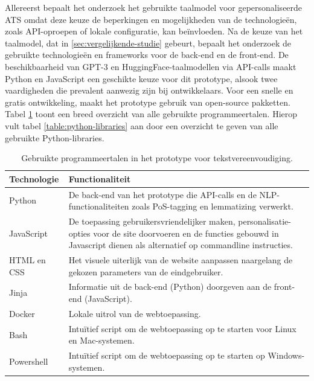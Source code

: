 Allereerst bepaalt het onderzoek het gebruikte taalmodel voor gepersonaliseerde ATS omdat deze keuze de beperkingen en mogelijkheden van de technologieën, zoals API-oproepen of lokale configuratie, kan beïnvloeden. Na de keuze van het taalmodel, dat in \ref{sec:vergelijkende-studie} gebeurt, bepaalt het onderzoek de gebruikte technologieën en frameworks voor de back-end en de front-end. De beschikbaarheid van GPT-3 en HuggingFace-taalmodellen via API-calls maakt Python en JavaScript een geschikte keuze voor dit prototype, alsook twee vaardigheden die prevalent aanwezig zijn bij ontwikkelaars. Voor een snelle en gratis ontwikkeling, maakt het prototype gebruik van open-source pakketten. Tabel \ref{table:technologies} toont een breed overzicht van alle gebruikte programmeertalen. Hierop vult tabel \ref{table:python-libraries} aan door een overzicht te geven van alle gebruikte Python-libraries.

\begin{center}
	\begin{table}[H]
	\begin{tabular}{ | m{4cm} | m{11cm} | } 
		\hline
		\textbf{Technologie} 	& \textbf{Functionaliteit} \\
		\hline
		Python 					& De back-end van het prototype die API-calls en de NLP-functionaliteiten zoals PoS-tagging en lemmatizing verwerkt. \\
		\hline
		JavaScript 				& De toepassing gebruikersvriendelijker maken, personalisatie-opties voor de site doorvoeren en de functies gebouwd in Javascript dienen als alternatief op commandline instructies. \\
		\hline
		HTML en CSS 			& Het visuele uiterlijk van de website aanpassen naargelang de gekozen parameters van de eindgebruiker. \\
		\hline
		Jinja 					& Informatie uit de back-end (Python) doorgeven aan de front-end (JavaScript).  \\
		\hline
		Docker 					& Lokale uitrol van de webtoepassing. \\
		\hline
		Bash					& Intuïtief script om de webtoepassing op te starten voor Linux en Mac-systemen. \\
		\hline
		Powershell 				& Intuïtief script om de webtoepassing op te starten op Windows-systemen. \\
		\hline
	\end{tabular}
	\caption{Gebruikte programmeertalen in het prototype voor tekstvereenvoudiging.}
	\label{table:technologies}
	\end{table}
\end{center}

